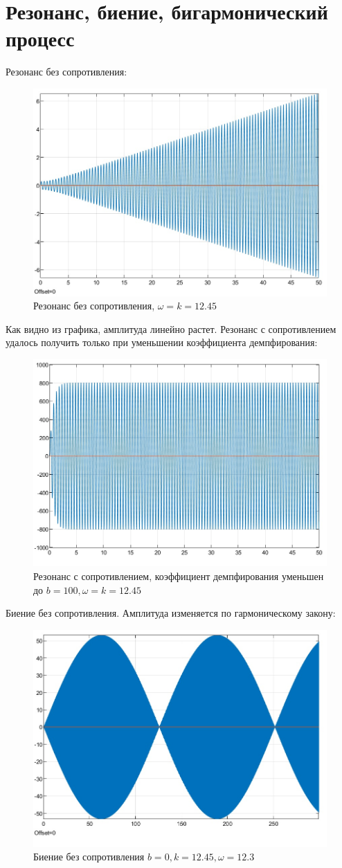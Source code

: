 \documentclass{article}
\begin{document}
	\section*{Резонанс, биение, бигармонический процесс}
	Резонанс без сопротивления:
	\begin{figure}[H]
		\centering
		\includegraphics[width=0.7\linewidth]{graph8}
		\caption{Резонанс без сопротивления, $\omega = k = 12.45$}

	\end{figure}
	Как видно из графика, амплитуда линейно растет.
	Резонанс с сопротивлением удалось получить только при уменьшении коэффициента демпфирования:
	\begin{figure}[H]
		\centering
		\includegraphics[width=0.7\linewidth]{graph10}
		\caption{Резонанс с сопротивлением, коэффициент демпфирования уменьшен до $b=100, \omega = k = 12.45$}

	\end{figure}
	Биение без сопротивления. Амплитуда изменяется по гармоническому закону:
	\begin{figure}[H]
		\centering
		\includegraphics[width=0.7\linewidth]{graph5}
		\caption{Биение без сопротивления $b=0, k = 12.45, \omega = 12.3$}

	\end{figure}
\end{document}
